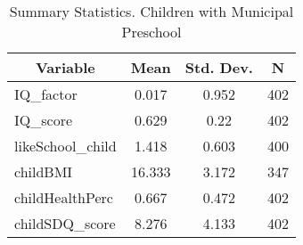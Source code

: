 
\begin{table}[htbp]\centering \caption{Summary Statistics. Children with Municipal Preschool \label{schoolChildmaternaMuni}}
\begin{tabular}{l c c  c}\hline\hline
\multicolumn{1}{c}{\textbf{Variable}} & \textbf{Mean}
 & \textbf{Std. Dev.} & \textbf{N}\\ \hline
IQ\_factor & 0.017 & 0.952  & 402\\
IQ\_score & 0.629 & 0.22  & 402\\
likeSchool\_child & 1.418 & 0.603  & 400\\
childBMI & 16.333 & 3.172  & 347\\
childHealthPerc & 0.667 & 0.472  & 402\\
childSDQ\_score & 8.276 & 4.133  & 402\\
\hline\end{tabular}
\end{table}
